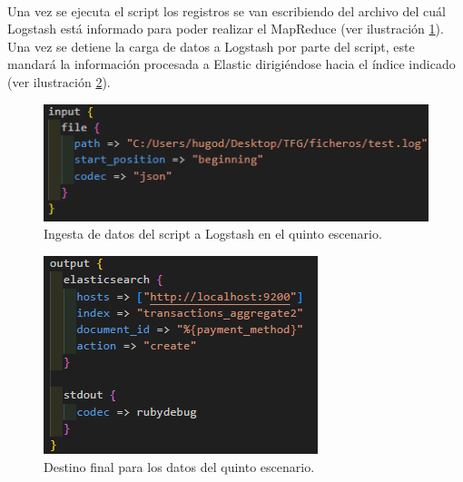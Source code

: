 \paragraph{}
\paragraph{}

Una vez se ejecuta el script los registros se van escribiendo del archivo del cuál Logstash está informado para poder realizar el MapReduce  (ver ilustración  \ref{fig:ingesta52}). Una vez se detiene la carga de datos a Logstash por parte del script, este mandará la información procesada a Elastic dirigiéndose hacia el índice indicado  (ver ilustración  \ref{fig:ingesta53}).

\begin{figure}
    \centering
    \includegraphics[width=1\linewidth]{img/ingesta52.png}
    \caption{Ingesta de datos del script a Logstash en el quinto escenario.}
    \label{fig:ingesta52}
\end{figure}

\begin{figure}
    \centering
    \includegraphics[width=1\linewidth]{img/ingesta53.png}
    \caption{Destino final para los datos del quinto escenario.}
    \label{fig:ingesta53}
\end{figure}

